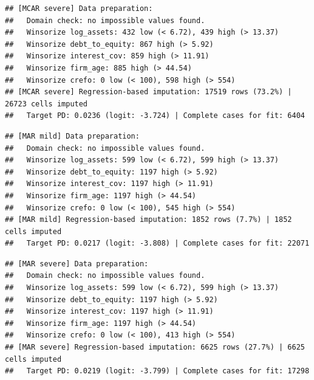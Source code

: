\documentclass[
]{article}
\newenvironment{Shaded}{\begin{snugshade}}{\end{snugshade}}
\newcommand{\AttributeTok}[1]{\textcolor[rgb]{0.13,0.29,0.53}{#1}}
\newcommand{\FunctionTok}[1]{\textcolor[rgb]{0.13,0.29,0.53}{\textbf{#1}}}
\newcommand{\NormalTok}[1]{#1}
\newcommand{\OtherTok}[1]{\textcolor[rgb]{0.56,0.35,0.01}{#1}}
\newcommand{\SpecialCharTok}[1]{\textcolor[rgb]{0.81,0.36,0.00}{\textbf{#1}}}
\newcommand{\StringTok}[1]{\textcolor[rgb]{0.31,0.60,0.02}{#1}}
\begin{document}
\begin{verbatim}
## [MCAR severe] Data preparation:
##   Domain check: no impossible values found.
##   Winsorize log_assets: 432 low (< 6.72), 439 high (> 13.37)
##   Winsorize debt_to_equity: 867 high (> 5.92)
##   Winsorize interest_cov: 859 high (> 11.91)
##   Winsorize firm_age: 885 high (> 44.54)
##   Winsorize crefo: 0 low (< 100), 598 high (> 554)
## [MCAR severe] Regression-based imputation: 17519 rows (73.2%) | 26723 cells imputed
##   Target PD: 0.0236 (logit: -3.724) | Complete cases for fit: 6404
\end{verbatim}

\begin{Shaded}
\end{Shaded}

\begin{verbatim}
## [MAR mild] Data preparation:
##   Domain check: no impossible values found.
##   Winsorize log_assets: 599 low (< 6.72), 599 high (> 13.37)
##   Winsorize debt_to_equity: 1197 high (> 5.92)
##   Winsorize interest_cov: 1197 high (> 11.91)
##   Winsorize firm_age: 1197 high (> 44.54)
##   Winsorize crefo: 0 low (< 100), 545 high (> 554)
## [MAR mild] Regression-based imputation: 1852 rows (7.7%) | 1852 cells imputed
##   Target PD: 0.0217 (logit: -3.808) | Complete cases for fit: 22071
\end{verbatim}

\begin{Shaded}
\end{Shaded}

\begin{verbatim}
## [MAR severe] Data preparation:
##   Domain check: no impossible values found.
##   Winsorize log_assets: 599 low (< 6.72), 599 high (> 13.37)
##   Winsorize debt_to_equity: 1197 high (> 5.92)
##   Winsorize interest_cov: 1197 high (> 11.91)
##   Winsorize firm_age: 1197 high (> 44.54)
##   Winsorize crefo: 0 low (< 100), 413 high (> 554)
## [MAR severe] Regression-based imputation: 6625 rows (27.7%) | 6625 cells imputed
##   Target PD: 0.0219 (logit: -3.799) | Complete cases for fit: 17298
\end{verbatim}
\end{document}
